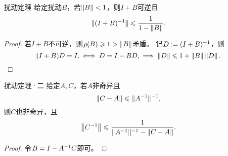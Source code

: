 \begin{theorem}
    {扰动定理}{}
    给定扰动$B$，若$\left\lVert B\right\rVert<1$，则$I+B$可逆且
    \begin{equation}
        \lVert(I+B)^{-1}\rVert\leqslant\frac1{1-\left\lVert B\right\rVert}.
    \end{equation}
\end{theorem}

\begin{proof}
    若$I+B$不可逆，则$\rho(B)\geqslant 1>\left\lVert B\right\rVert$矛盾。
    记$D:=(I+B)^{-1}$，则 
    \[
        (I+B)D=I,\iff D=I-BD,\implies \left\lVert D\right\rVert\leqslant 1+\left\lVert B\right\rVert\left\lVert D\right\rVert.
        \qedhere
    \]
\end{proof}

\begin{theorem}
    {扰动定理·二}{}
    给定$A,C$，若$A$非奇异且
    \[
        \left\lVert C-A\right\rVert\leqslant\lVert A^{-1}\rVert^{-1},
    \]
    则$C$也非奇异，且
    \begin{equation}
        \left\lVert C^{-1}\right\rVert\leqslant\frac{1}{\lVert A^{-1}\rVert^{-1}-\left\lVert C-A\right\rVert}.
    \end{equation}
\end{theorem}

\begin{proof}
    令$B=I-A^{-1} C$即可。
\end{proof}



